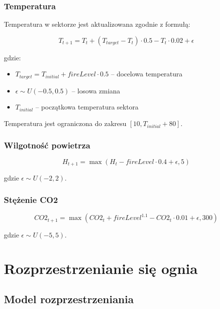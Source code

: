 \documentclass[11pt,a4paper]{article}
\begin{document}
\subsubsection{Temperatura}

Temperatura w sektorze jest aktualizowana zgodnie z formułą:

\begin{equation}
T_{t+1} = T_t + (T_{target} - T_t) \cdot 0.5 - T_t \cdot 0.02 + \epsilon
\end{equation}

gdzie:
\begin{itemize}
    \item $T_{target} = T_{initial} + fireLevel \cdot 0.5$ -- docelowa temperatura
    \item $\epsilon \sim U(-0.5, 0.5)$ -- losowa zmiana
    \item $T_{initial}$ -- początkowa temperatura sektora
\end{itemize}

Temperatura jest ograniczona do zakresu $[10, T_{initial} + 80]$.

\subsubsection{Wilgotność powietrza}

\begin{equation}
H_{t+1} = \max(H_t - fireLevel \cdot 0.4 + \epsilon, 5)
\end{equation}

gdzie $\epsilon \sim U(-2, 2)$.

\subsubsection{Stężenie CO2}

\begin{equation}
CO2_{t+1} = \max(CO2_t + fireLevel^{1.1} - CO2_t \cdot 0.01 + \epsilon, 300)
\end{equation}

gdzie $\epsilon \sim U(-5, 5)$.

\section{Rozprzestrzenianie się ognia}

\subsection{Model rozprzestrzeniania}
\end{document}
